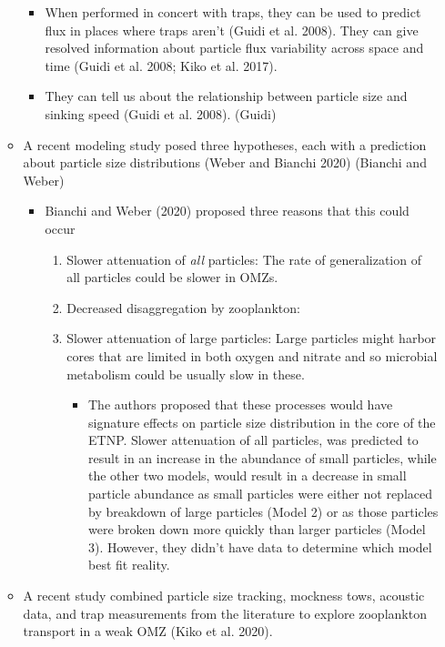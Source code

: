 \documentclass[]{article}
\providecommand{\tightlist}{%
  \setlength{\itemsep}{0pt}\setlength{\parskip}{0pt}}
\begin{document}
\begin{itemize}
\begin{itemize}
    \begin{itemize}
    \tightlist
    \item
      When performed in concert with traps, they can be used to predict
      flux in places where traps aren't (Guidi et al. 2008). They can
      give resolved information about particle flux variability across
      space and time (Guidi et al. 2008; Kiko et al. 2017).
    \item
      They can tell us about the relationship between particle size and
      sinking speed (Guidi et al. 2008). (Guidi)
    \end{itemize}
  \item
    A recent modeling study posed three hypotheses, each with a
    prediction about particle size distributions (Weber and Bianchi
    2020) (Bianchi and Weber)

    \begin{itemize}
    \tightlist
    \item
      Bianchi and Weber (2020) proposed three reasons that this could
      occur

      \begin{enumerate}
      \def\labelenumi{(\arabic{enumi})}
      \tightlist
      \item
        Slower attenuation of \emph{all} particles: The rate of
        generalization of all particles could be slower in OMZs.
      \item
        Decreased disaggregation by zooplankton:
      \item
        Slower attenuation of large particles: Large particles might
        harbor cores that are limited in both oxygen and nitrate and so
        microbial metabolism could be usually slow in these.

        \begin{itemize}
        \tightlist
        \item
          The authors proposed that these processes would have signature
          effects on particle size distribution in the core of the ETNP.
          Slower attenuation of all particles, was predicted to result
          in an increase in the abundance of small particles, while the
          other two models, would result in a decrease in small particle
          abundance as small particles were either not replaced by
          breakdown of large particles (Model 2) or as those particles
          were broken down more quickly than larger particles (Model 3).
          However, they didn't have data to determine which model best
          fit reality.
        \end{itemize}
      \end{enumerate}
    \end{itemize}
  \item
    A recent study combined particle size tracking, mockness tows,
    acoustic data, and trap measurements from the literature to explore
    zooplankton transport in a weak OMZ (Kiko et al. 2020).


\end{itemize}
\end{itemize}
\end{document}
